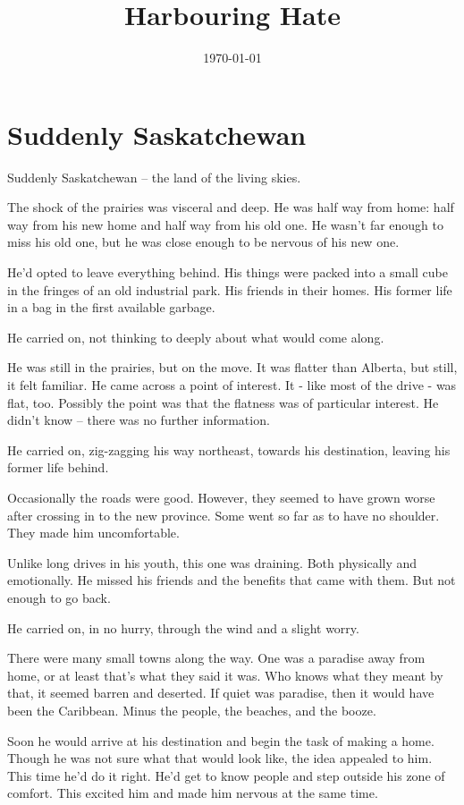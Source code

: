 \documentclass[fontsize=12pt,english]{article}
\title{Harbouring Hate}
\author{}
\date{\today}
\begin{document}
\maketitle
\tableofcontents
\newpage

\section{Suddenly Saskatchewan}

Suddenly Saskatchewan -- the land of the living skies.

The shock of the prairies was visceral and deep. He was half way from
home: half way from his new home and half way from his old one. He
wasn't far enough to miss his old one, but he was close enough to be
nervous of his new one.

He'd opted to leave everything behind. His things were packed into a
small cube in the fringes of an old industrial park. His friends in
their homes. His former life in a bag in the first available garbage.

He carried on, not thinking to deeply about what would come along.

He was still in the prairies, but on the move. It was flatter than
Alberta, but still, it felt familiar. He came across a point of
interest. It - like most of the drive - was flat, too. Possibly the
point was that the flatness was of particular interest. He didn't know
-- there was no further information.

He carried on, zig-zagging his way northeast, towards his destination,
leaving his former life behind.

Occasionally the roads were good. However, they seemed to have grown
worse after crossing in to the new province. Some went so far as to
have no shoulder. They made him uncomfortable.

Unlike long drives in his youth, this one was draining. Both
physically and emotionally. He missed his friends and the benefits
that came with them. But not enough to go back.

He carried on, in no hurry, through the wind and a slight worry.

There were many small towns along the way. One was a paradise away
from home, or at least that's what they said it was. Who knows what
they meant by that, it seemed barren and deserted. If quiet was
paradise, then it would have been the Caribbean. Minus the people, the
beaches, and the booze.

Soon he would arrive at his destination and begin the task of making a
home. Though he was not sure what that would look like, the idea
appealed to him. This time he'd do it right. He'd get to know people
and step outside his zone of comfort. This excited him and made him
nervous at the same time.
\end{document}
